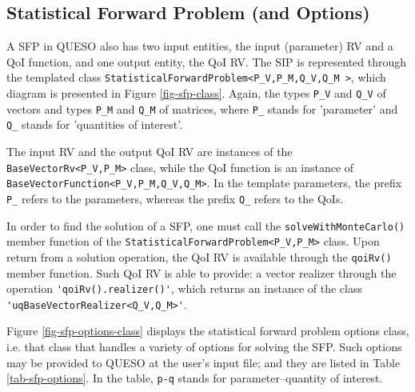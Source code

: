 % 
% 
% 


\subsection{Statistical Forward Problem (and Options)}

A SFP in QUESO also has two input entities, the input (parameter) RV and a QoI function, and one output entity, the QoI RV. 
The SIP is represented through the templated class \verb+StatisticalForwardProblem<P_V,P_M,Q_V,Q_M >+, which diagram is presented in Figure \ref{fig-sfp-class}. Again, the types \verb+P_V+ and \verb+Q_V+ of vectors and types \verb+P_M+ and \verb+Q_M+ of matrices, where \verb+P_+ stands for 'parameter' and \verb+Q_+ stands for 'quantities of interest'.

The input RV and the output QoI RV are instances of the \verb+BaseVectorRv<P_V,P_M>+ class, while
the QoI function is an instance of \verb+BaseVectorFunction<P_V,P_M,Q_V,Q_M>+.
In the template parameters, the prefix \verb+P_+ refers to the parameters, whereas the prefix \verb+Q_+ refers to the QoIs.

In order to find the solution of a SFP, one must call the \verb+solveWithMonteCarlo()+ member function of the \verb+StatisticalForwardProblem<P_V,P_M>+ class.
Upon return from a solution operation, the QoI RV is available through the \verb+qoiRv()+ member function. Such QoI RV  is able to provide:
a vector realizer through the operation \verb+'qoiRv().realizer()'+, which returns an instance of the class \verb+'uqBaseVectorRealizer<Q_V,Q_M>'+.



Figure \ref{fig-sfp-options-class} displays the  statistical forward problem options class, i.e. that class that handles a variety of options for solving the SFP. Such options may be provided to QUESO at the user's input file; and they are listed in Table \ref{tab-sfp-options}. In the table, \texttt{p-q} stands for parameter--quantity of interest. 



